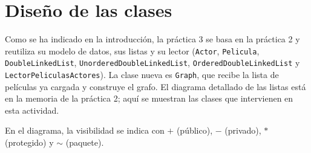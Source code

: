 \documentclass[a4paper,11pt]{report}
\begin{document}
\chapter{Diseño de las clases}

Como se ha indicado en la introducción, la práctica 3 se basa en la práctica 2 y reutiliza su modelo de datos, sus listas y su lector (\texttt{Actor}, \texttt{Pelicula}, \texttt{Double\allowbreak Linked\allowbreak List}, \texttt{Unordered\allowbreak Double\allowbreak Linked\allowbreak List}, \texttt{Ordered\allowbreak Double\allowbreak Linked\allowbreak List} y \texttt{Lector\allowbreak Peliculas\allowbreak Actores}). La clase nueva es \texttt{Graph}, que recibe la lista de películas ya cargada y construye el grafo. El diagrama detallado de las listas está en la memoria de la práctica 2; aquí se muestran las clases que intervienen en esta actividad.

En el diagrama, la visibilidad se indica con $+$ (público), $-$ (privado), $*$ (protegido) y $\sim$ (paquete).
\end{document}
